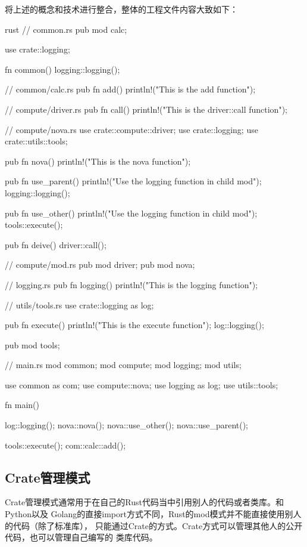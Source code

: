 将上述的概念和技术进行整合，整体的工程文件内容大致如下：
\begin{code-block}{rust}
// common.rs
pub mod calc;

use crate::logging;

fn common() {
    logging::logging();
}

// common/calc.rs
pub fn add() {
    println!("This is the add function");
}

// compute/driver.rs
pub fn call() {
    println!("This is the driver::call function");
}

// compute/nova.rs
use crate::compute::driver;
use crate::logging;
use crate::utils::tools;

pub fn nova() {
    println!("This is the nova function");
}

pub fn use_parent() {
    println!("Use the logging function in child mod");
    logging::logging();
}

pub fn use_other() {
    println!("Use the logging function in child mod");
    tools::execute();
}

pub fn deive() {
    driver::call();
}

// compute/mod.rs
pub mod driver;
pub mod nova;

// logging.rs
pub fn logging() {
    println!("This is the logging function");
}

// utils/tools.rs
use crate::logging as log;

pub fn execute() {
    println!("This is the execute function");
    log::logging();
}

pub mod tools;

// main.rs
mod common;
mod compute;
mod logging;
mod utils;

use common as com;
use compute::nova;
use logging as log;
use utils::tools;

fn main() {
    log::logging();
    nova::nova();
    nova::use_other();
    nova::use_parent();

    tools::execute();
    com::calc::add();
}
\end{code-block}

\subsection{Crate管理模式}
Crate管理模式通常用于在自己的Rust代码当中引用别人的代码或者类库。和Python以及
Golang的直接import方式不同，Rust的mod模式并不能直接使用别人的代码（除了标准库），
只能通过Crate的方式。Crate方式可以管理其他人的公开代码，也可以管理自己编写的
类库代码。

